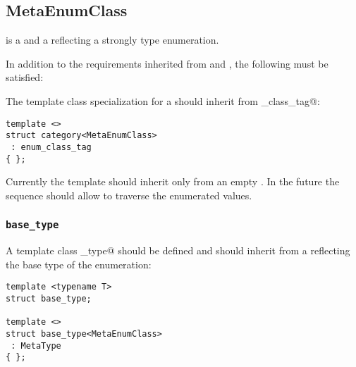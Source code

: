 \subsection{MetaEnumClass}
\label{concept-MetaEnumClass}

 is a  and a  reflecting a strongly type enumeration.

In addition to the requirements inherited from  and , the following must
be satisfied:

The \verb@category@ template class specialization for a  should
inherit from \verb@enum_class_tag@:

\begin{verbatim}
template <>
struct category<MetaEnumClass>
 : enum_class_tag
{ };
\end{verbatim}

Currently the \verb@members@ template should inherit only from an empty
. In the future the sequence should allow
to traverse the enumerated values.

\subsubsection{\texttt{base\_type}}

A template class \verb@base_type@ should be defined and should inherit from
a  reflecting the base type of the enumeration:

\begin{verbatim}
template <typename T>
struct base_type;

template <>
struct base_type<MetaEnumClass>
 : MetaType
{ };
\end{verbatim}
